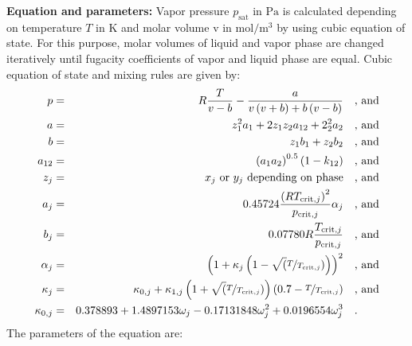 \textbf{Equation and parameters:}
\newline
%
Vapor pressure $p_\mathrm{sat}$ in $\si{\pascal}$ is calculated depending on temperature $T$ in $\si{\kelvin}$ and molar volume v in $\si{\mole\per\cubic\meter}$ by using cubic equation of state. For this purpose, molar volumes of liquid and vapor phase are changed iteratively until fugacity coefficients of vapor and liquid phase are equal. Cubic equation of state and mixing rules are given by:
\begin{equation*}
\begin{split}
p &=& R \frac{T}{v - b} - \frac{a}{v \left(v + b\right) + b \left(v - b\right)} & \quad\text{, and} \\
a &=& z_1^2 a_1 + 2 z_1 z_2 a_{12} + 2_2^2 a_2 & \quad\text{, and} \\
b &=& z_1 b_1 + z_2 b_2 & \quad\text{, and} \\
a_{12} &=& \left( a_1 a_2 \right) ^{0.5} \left(1 - k_{12} \right) & \quad\text{, and} \\
z_j &=& x_j \textrm { or } y_j \textrm{ depending on phase} & \quad\text{, and} \\
a_j &=& 0.45724 \frac{\left(R T_{\mathrm{crit},j} \right)^2}{p_{\mathrm{crit},j}} \alpha_j & \quad\text{, and} \\
b_j &=& 0.07780 R \frac{T_{\mathrm{crit},j}}{p_{\mathrm{crit},j}} & \quad\text{, and} \\
\alpha_j &=& \left(1 + \kappa_j \left(1 - \sqrt(\nicefrac{T}{T_{\mathrm{crit},j}}) \right) \right)^2 & \quad\text{, and} \\
\kappa_j &=& \kappa_{0,j} + \kappa_{1,j} \left(1 + \sqrt(\nicefrac{T}{T_{\mathrm{crit},j}}) \right) \left(0.7 - \nicefrac{T}{T_{\mathrm{crit},j}}\right)  & \quad\text{, and} \\
\kappa_{0,j} &=& 0.378893 + 1.4897153 \omega_j - 0.17131848 \omega_j^2 + 0.0196554 \omega_j^3 & \quad\text{.}
\end{split}
\end{equation*}
%
The parameters of the equation are:
%
